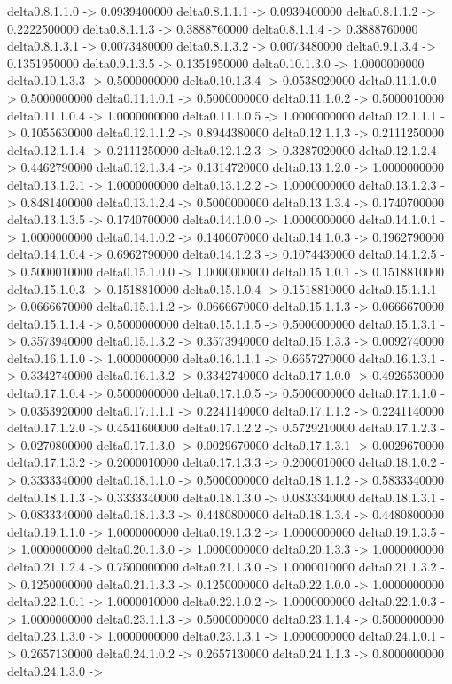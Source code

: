 delta0.8.1.1.0 -> 0.0939400000    delta0.8.1.1.1 -> 0.0939400000    delta0.8.1.1.2 -> 0.2222500000    delta0.8.1.1.3 -> 0.3888760000    delta0.8.1.1.4 -> 0.3888760000    delta0.8.1.3.1 -> 0.0073480000    delta0.8.1.3.2 -> 0.0073480000    delta0.9.1.3.4 -> 0.1351950000    delta0.9.1.3.5 -> 0.1351950000    delta0.10.1.3.0 -> 1.0000000000    delta0.10.1.3.3 -> 0.5000000000    delta0.10.1.3.4 -> 0.0538020000    delta0.11.1.0.0 -> 0.5000000000    delta0.11.1.0.1 -> 0.5000000000    delta0.11.1.0.2 -> 0.5000010000    delta0.11.1.0.4 -> 1.0000000000    delta0.11.1.0.5 -> 1.0000000000    delta0.12.1.1.1 -> 0.1055630000    delta0.12.1.1.2 -> 0.8944380000    delta0.12.1.1.3 -> 0.2111250000    delta0.12.1.1.4 -> 0.2111250000    delta0.12.1.2.3 -> 0.3287020000    delta0.12.1.2.4 -> 0.4462790000    delta0.12.1.3.4 -> 0.1314720000    delta0.13.1.2.0 -> 1.0000000000    delta0.13.1.2.1 -> 1.0000000000    delta0.13.1.2.2 -> 1.0000000000    delta0.13.1.2.3 -> 0.8481400000    delta0.13.1.2.4 -> 0.5000000000    delta0.13.1.3.4 -> 0.1740700000    delta0.13.1.3.5 -> 0.1740700000    delta0.14.1.0.0 -> 1.0000000000    delta0.14.1.0.1 -> 1.0000000000    delta0.14.1.0.2 -> 0.1406070000    delta0.14.1.0.3 -> 0.1962790000    delta0.14.1.0.4 -> 0.6962790000    delta0.14.1.2.3 -> 0.1074430000    delta0.14.1.2.5 -> 0.5000010000    delta0.15.1.0.0 -> 1.0000000000    delta0.15.1.0.1 -> 0.1518810000    delta0.15.1.0.3 -> 0.1518810000    delta0.15.1.0.4 -> 0.1518810000    delta0.15.1.1.1 -> 0.0666670000    delta0.15.1.1.2 -> 0.0666670000    delta0.15.1.1.3 -> 0.0666670000    delta0.15.1.1.4 -> 0.5000000000    delta0.15.1.1.5 -> 0.5000000000    delta0.15.1.3.1 -> 0.3573940000    delta0.15.1.3.2 -> 0.3573940000    delta0.15.1.3.3 -> 0.0092740000    delta0.16.1.1.0 -> 1.0000000000    delta0.16.1.1.1 -> 0.6657270000    delta0.16.1.3.1 -> 0.3342740000    delta0.16.1.3.2 -> 0.3342740000    delta0.17.1.0.0 -> 0.4926530000    delta0.17.1.0.4 -> 0.5000000000    delta0.17.1.0.5 -> 0.5000000000    delta0.17.1.1.0 -> 0.0353920000    delta0.17.1.1.1 -> 0.2241140000    delta0.17.1.1.2 -> 0.2241140000    delta0.17.1.2.0 -> 0.4541600000    delta0.17.1.2.2 -> 0.5729210000    delta0.17.1.2.3 -> 0.0270800000    delta0.17.1.3.0 -> 0.0029670000    delta0.17.1.3.1 -> 0.0029670000    delta0.17.1.3.2 -> 0.2000010000    delta0.17.1.3.3 -> 0.2000010000    delta0.18.1.0.2 -> 0.3333340000    delta0.18.1.1.0 -> 0.5000000000    delta0.18.1.1.2 -> 0.5833340000    delta0.18.1.1.3 -> 0.3333340000    delta0.18.1.3.0 -> 0.0833340000    delta0.18.1.3.1 -> 0.0833340000    delta0.18.1.3.3 -> 0.4480800000    delta0.18.1.3.4 -> 0.4480800000    delta0.19.1.1.0 -> 1.0000000000    delta0.19.1.3.2 -> 1.0000000000    delta0.19.1.3.5 -> 1.0000000000    delta0.20.1.3.0 -> 1.0000000000    delta0.20.1.3.3 -> 1.0000000000    delta0.21.1.2.4 -> 0.7500000000    delta0.21.1.3.0 -> 1.0000010000    delta0.21.1.3.2 -> 0.1250000000    delta0.21.1.3.3 -> 0.1250000000    delta0.22.1.0.0 -> 1.0000000000    delta0.22.1.0.1 -> 1.0000010000    delta0.22.1.0.2 -> 1.0000000000    delta0.22.1.0.3 -> 1.0000000000    delta0.23.1.1.3 -> 0.5000000000    delta0.23.1.1.4 -> 0.5000000000    delta0.23.1.3.0 -> 1.0000000000    delta0.23.1.3.1 -> 1.0000000000    delta0.24.1.0.1 -> 0.2657130000    delta0.24.1.0.2 -> 0.2657130000    delta0.24.1.1.3 -> 0.8000000000    delta0.24.1.3.0 -> 